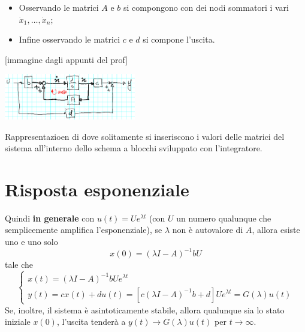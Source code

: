 \begin{landscape}
\begin{multicols*}{3}
\begin{itemize}
        \item Osservando le matrici $A$ e $b$ si compongono con dei nodi sommatori i vari $\dot{x}_1, \dots, \dot{x}_n$;
        \item Infine osservando le matrici $c$ e $d$ si compone l'uscita.
    \end{itemize}
    [immagine dagli appunti del prof]
    \begin{center}
        \includegraphics[height=2cm]{../lezione8/img1.PNG}
    \end{center}
    Rappresentazioen di dove solitamente si inseriscono i valori delle matrici del sistema all'interno dello schema a blocchi sviluppato con l'integratore.
    \section{Risposta esponenziale}
    Quindi \textbf{in generale} con $u(t) = U e^{\lambda t}$ (con $U$ un numero qualunque che semplicemente amplifica l'esponenziale), se $\lambda$ non è autovalore di $A$, allora esiste uno e uno solo 
    \[
        x(0) = (\lambda I - A)^{-1}b U
    \] tale che 
    \[
        \begin{cases}
            x(t) = (\lambda I -A)^{-1} b U e^{\lambda t}\\
            y(t) = cx(t) + du(t) =  [c(\lambda I -A)^{-1} b + d] U e^{\lambda t} = G(\lambda) u(t)
        \end{cases}
    \]
    Se, inoltre, il sistema è asintoticamente stabile, allora qualunque sia lo stato iniziale $x(0)$, l'uscita tenderà a $y(t) \rightarrow G(\lambda) u(t)$ per $t \rightarrow  \infty$.

\end{multicols*}
\end{landscape}
